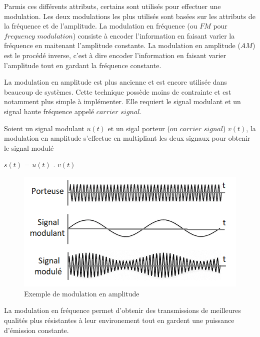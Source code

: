 \vspace{0.1cm}

Parmis ces différents attributs, certains sont utilisés pour effectuer une modulation. Les deux modulations les plus utilisés sont basées sur les attributs de la fréquence et de l'amplitude. La modulation en fréquence (ou $FM$ pour $frequency$ $modulation$) consiste à encoder l'information en faisant varier la fréquence en maitenant l'amplitude constante. La modulation en amplitude ($AM$) est le procédé inverse, c'est à dire encoder l'information en faisant varier l'amplitude tout en gardant la fréquence constante. 

\vspace{0.1cm}

La modulation en amplitude est plus ancienne et est encore utilisée dans beaucoup de systèmes. Cette technique possède moins de contrainte et est notamment plus simple à implémenter. Elle requiert le signal modulant et un signal haute fréquence appelé $carrier$ $signal$.

\vspace{0.1cm}

Soient un signal modulant $u(t)$ et un sigal porteur (ou $carrier$ $signal$) $v(t)$, la modulation en amplitude s'effectue en multipliant les deux signaux pour obtenir le signal modulé 

\vspace{0.1cm}

$s(t)$ = $u(t)$ . $v(t)$

\begin{figure}[h]
\centering

\includegraphics[scale=1]{images/AM_mod.PNG}
\caption{Exemple de modulation en amplitude}\label{term4}
\end{figure}


La modulation en fréquence permet d'obtenir des transmissions de meilleures qualités plus résistantes à leur environement tout en gardent une puissance d'émission constante. 


